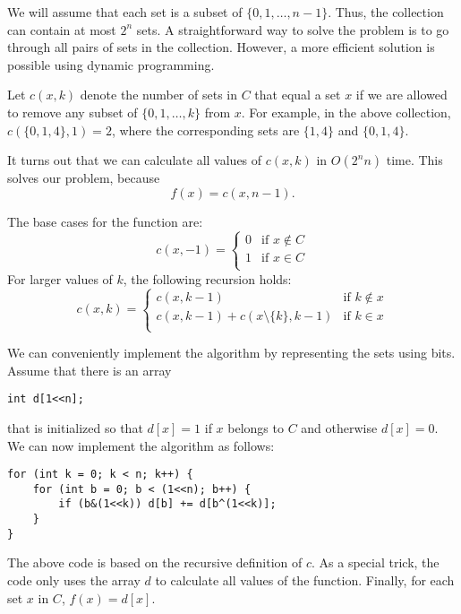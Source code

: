 We will assume that each set is
a subset of $\{0,1,\ldots,n-1\}$.
Thus, the collection can contain at most
$2^n$ sets.
A straightforward way to solve the problem
is to go through all pairs of sets in the collection.
However, a more efficient solution is possible
using dynamic programming.

Let $c(x,k)$ denote the number of sets in
$C$ that equal a set $x$
if we are allowed to remove any subset of
$\{0,1,\ldots,k\}$ from $x$.
For example, in the above collection,
$c(\{0,1,4\},1)=2$,
where the corresponding sets are
$\{1,4\}$ and $\{0,1,4\}$.

It turns out that we can calculate all
values of $c(x,k)$ in $O(2^n n)$ time.
This solves our problem, because
\[f(x)=c(x,n-1).\]

The base cases for the function are:
\begin{equation*}
    c(x,-1) = \begin{cases}
               0 & \textrm{if $x \notin C$}\\
               1 & \textrm{if $x \in C$}\\
           \end{cases}
\end{equation*}
For larger values of $k$, the following recursion holds:
\begin{equation*}
    c(x,k) = \begin{cases}
               c(x,k-1)          & \textrm{if $k \notin x$}\\
               c(x,k-1)+c(x \setminus \{k\},k-1)    & \textrm{if $k \in x$}\\
           \end{cases}
\end{equation*}

We can conveniently implement the algorithm by representing
the sets using bits.
Assume that there is an array
\begin{lstlisting}
int d[1<<n];
\end{lstlisting}
that is initialized so that $d[x]=1$ if $x$ belongs to $C$
and otherwise $d[x]=0$.
We can now implement the algorithm as follows:

\begin{lstlisting}
for (int k = 0; k < n; k++) {
    for (int b = 0; b < (1<<n); b++) {
        if (b&(1<<k)) d[b] += d[b^(1<<k)];
    }
}
\end{lstlisting}
The above code is based on the recursive definition
of $c$. As a special trick, the code only uses
the array $d$ to calculate all values of the function.
Finally, for each set $x$ in $C$, $f(x)=d[x]$.

